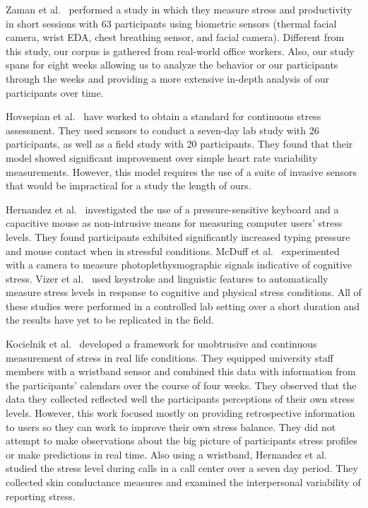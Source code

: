 Zaman et al.~\cite{Zaman19} performed a study in which they measure stress and productivity in short sessions with 63 participants using biometric sensors (thermal facial camera, wrist EDA, chest breathing sensor, and facial camera). Different from this study, our corpus is gathered from real-world office workers. Also, our study spans for eight weeks allowing us to analyze the behavior or our participants through the weeks and providing a more extensive in-depth analysis of our participants over time.

Hovsepian et al.~\cite{Hovsepian15} have worked to obtain a standard for continuous stress assessment. They used sensors to conduct a seven-day lab study with 26 participants, as well as a field study with 20 participants. They found that their model showed significant improvement over simple heart rate variability measurements. However, this model requires the use of a suite of invasive sensors that would be impractical for a study the length of ours. 

Hernandez et al.~\cite{Hernandez14} investigated the use of a pressure-sensitive keyboard and a capacitive mouse as non-intrusive means for measuring computer users' stress levels. They found participants exhibited significantly increased typing pressure and mouse contact when in stressful conditions. McDuff et al.~\cite{mcduff16} experimented with a camera to measure photoplethysmographic signals indicative of cognitive stress. Vizer et al.~\cite{vizer_automated_2009} used keystroke and linguistic features to automatically measure stress levels in response to cognitive and physical stress conditions. All of these studies were performed in a controlled lab setting over a short duration and the results have yet to be replicated in the field.

Kocielnik et al.~\cite{kocielnik_smart_2013} developed a framework for unobtrusive and continuous measurement of stress in real life conditions. They equipped university staff members with a wristband sensor and combined this data with information from the participants' calendars over the course of four weeks. They observed that the data they collected reflected well the participants perceptions of their own stress levels. However, this work focused mostly on providing retrospective information to users so they can work to improve their own stress balance. They did not attempt to make observations about the big picture of participants stress profiles or make predictions in real time. Also using a wristband, Hernandez et al.~\cite{Hernandez11} studied the stress level during calls in a call center over a seven day period. They collected skin conductance measures and examined the interpersonal variability of reporting stress. 


